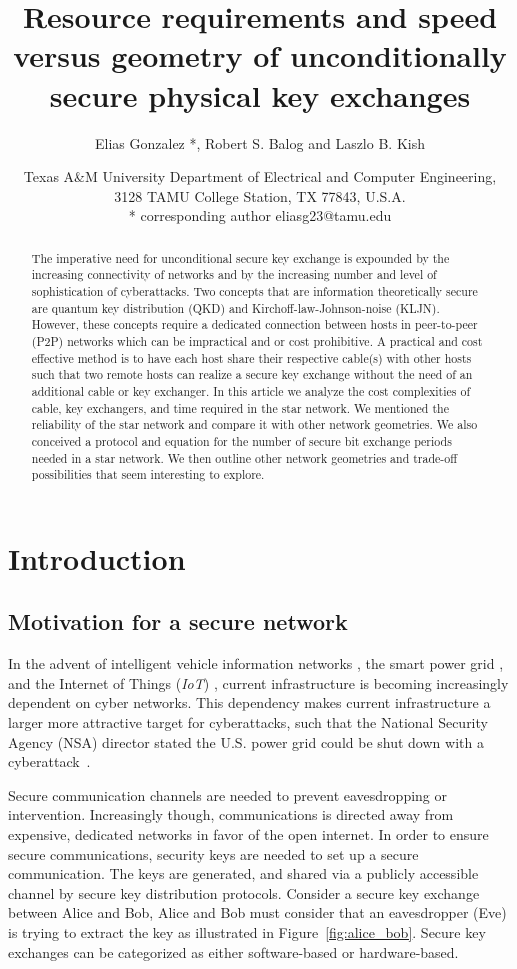 \documentclass[a4paper,12pt,pdftex]{article}
\title{Resource requirements and speed versus geometry of unconditionally secure physical key exchanges}
\author{Elias Gonzalez *, Robert S. Balog  and Laszlo B. Kish  }
\date{ Texas A\&M University Department of Electrical and Computer Engineering, 3128 TAMU College Station, TX 77843, U.S.A. \\ * corresponding author eliasg23@tamu.edu}
\begin{document}
\maketitle


\begin{abstract}
The imperative need for unconditional secure key exchange is expounded by the increasing connectivity of networks and by the increasing number and level of sophistication of cyberattacks. Two concepts that are information theoretically secure are quantum key distribution (QKD) and Kirchoff-law-Johnson-noise (KLJN). However, these concepts require a dedicated connection between hosts in peer-to-peer (P2P) networks which can be impractical and or cost prohibitive. A practical and cost effective method is to have each host share their respective cable(s) with other hosts such that two remote hosts can realize a secure key exchange without the need of an additional cable or key exchanger. In this article we analyze the cost complexities of cable, key exchangers, and time required in the star network. We mentioned the reliability of the star network and compare it with other network geometries. We also conceived a protocol and equation for the number of secure bit exchange periods needed in a star network. We then outline other network geometries and trade-off possibilities that seem interesting to explore.
\end{abstract}


\section{Introduction}

\subsection{Motivation for a secure network}

In the advent of intelligent vehicle information networks \cite{evs}, the smart power grid \cite{powergrid}, and the Internet of Things (\textit{IoT}) \cite{iot}, current infrastructure is becoming increasingly dependent on cyber networks. This dependency makes current infrastructure a larger more attractive target for cyberattacks, such that the National Security Agency (NSA) director stated the U.S. power grid could be shut down with a cyberattack~\cite{nsa_china}. 

Secure communication channels are needed to prevent eavesdropping or intervention. Increasingly though, communications is directed away from expensive, dedicated networks in favor of the open internet. In order to ensure secure communications, security keys are needed to set up a secure communication.  The keys are generated, and shared via a publicly accessible channel by secure key distribution protocols. Consider a secure key exchange between Alice and Bob, Alice and Bob must consider that an eavesdropper (Eve) is trying to extract the key as illustrated in Figure~\ref{fig:alice_bob}. Secure key exchanges can be categorized as either software-based or hardware-based.
\end{document}
